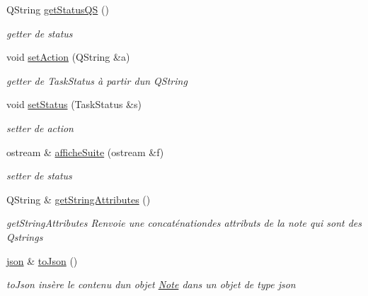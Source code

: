 \begin{DoxyCompactItemize}
\mbox{\label{classTask_a830f8699d625ac07cd4c1c7951e2fec0}} 
Q\+String \hyperlink{classTask_a830f8699d625ac07cd4c1c7951e2fec0}{get\+Status\+QS} ()
\begin{DoxyCompactList}\small\item\em getter de status \end{DoxyCompactList}\item 
\mbox{\label{classTask_abe5ac8e46428a9f3a127f583acc9beff}} 
void \hyperlink{classTask_abe5ac8e46428a9f3a127f583acc9beff}{set\+Action} (Q\+String \&a)
\begin{DoxyCompactList}\small\item\em getter de Task\+Status à partir d\textquotesingle{}un Q\+String \end{DoxyCompactList}\item 
\mbox{\label{classTask_a53cf044a6d3a91711706eb8d88e3e0a6}} 
void \hyperlink{classTask_a53cf044a6d3a91711706eb8d88e3e0a6}{set\+Status} (Task\+Status \&s)
\begin{DoxyCompactList}\small\item\em setter de action \end{DoxyCompactList}\item 
ostream \& \hyperlink{classTask_aaef115655e5c20b9919da726ae526f8a}{affiche\+Suite} (ostream \&f)
\begin{DoxyCompactList}\small\item\em setter de status \end{DoxyCompactList}\item 
Q\+String \& \hyperlink{classTask_a410f65f8d06198e75d8faec574827726}{get\+String\+Attributes} ()
\begin{DoxyCompactList}\small\item\em get\+String\+Attributes Renvoie une concaténationdes attributs de la note qui sont des Qstrings \end{DoxyCompactList}\item 
\hyperlink{classnlohmann_1_1basic__json}{json} \& \hyperlink{classTask_af20f0085e2426cbf64955a03d8920400}{to\+Json} ()
\begin{DoxyCompactList}\small\item\em to\+Json insère le contenu d\textquotesingle{}un objet \hyperlink{classNote}{Note} dans un objet de type json \end{DoxyCompactList}\end{DoxyCompactItemize}

